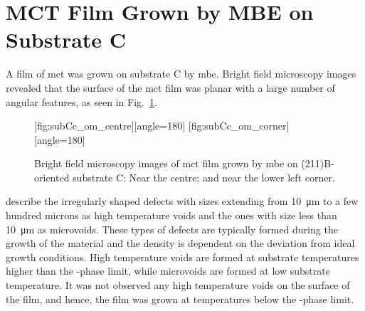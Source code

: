 \clearpage
\section{MCT Film Grown by MBE on  Substrate C}\label{sec:subCc}

A film of \acl{mct} was grown on substrate C by \ac{mbe}. Bright field microscopy images revealed that the surface of the \ac{mct} film was planar with a large number of angular features, as seen in Fig.~\ref{fig:subCc_om}.

\begin{figure}[htbp]
    \centering
    [fig:subCc_om_centre][angle=180]
    \hfill
    [fig:subCc_om_corner][angle=180]
    \caption[Bright field microscopy images of \ac{mct} film grown by \ac{mbe} on substrate C.]{Bright field microscopy images of \ac{mct} film grown by \ac{mbe} on (211)B-oriented substrate C:  Near the centre; and  near the lower left corner.}
    \label{fig:subCc_om}
\end{figure}

\citet{selvig2007defects} describe the irregularly shaped defects with sizes extending from \SI{10}{\micro\metre} to a few hundred microns as high temperature voids and the ones with size less than \SI{10}{\micro\metre} as microvoids. These types of defects are typically formed during the growth of the material and the density is dependent on the deviation from ideal growth conditions. High temperature voids are formed at substrate temperatures higher than the -phase limit, while microvoids are formed at low substrate temperature. It was not observed any high temperature voids on the surface of the film, and hence, the film was grown at temperatures below the -phase limit.



